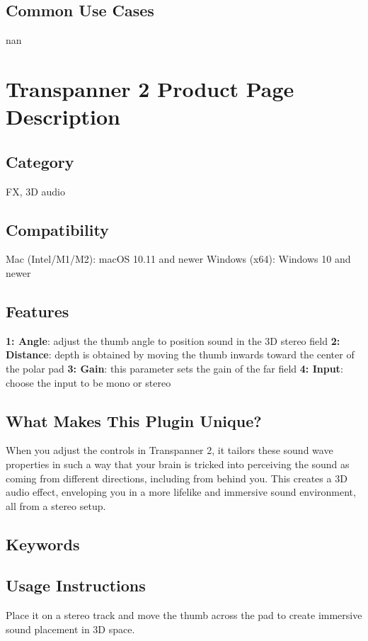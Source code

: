 \documentclass[8pt]{article}
\begin{document}
\subsection*{Common Use Cases}
nan
\section*{Transpanner 2 Product Page Description}

\subsection*{Category}
FX, 3D audio

\subsection*{Compatibility}
Mac (Intel/M1/M2): macOS 10.11 and newer
Windows (x64): Windows 10 and newer

\subsection*{Features}
\textbf{1: Angle}: adjust the thumb angle to position sound in the 3D stereo field
\textbf{2: Distance}: depth is obtained by moving the thumb inwards toward the center of the polar pad
\textbf{3: Gain}: this parameter sets the gain of the far field
\textbf{4: Input}: choose the input to be mono or stereo

\subsection*{What Makes This Plugin Unique?}
When you adjust the controls in Transpanner 2, it tailors these sound wave properties in such a way that your brain is tricked into perceiving the sound as coming from different directions, including from behind you. This creates a 3D audio effect, enveloping you in a more lifelike and immersive sound environment, all from a stereo setup.

\subsection*{Keywords}


\subsection*{Usage Instructions}
Place it on a stereo track and move the thumb across the pad to create immersive sound placement in 3D space. 
\end{document}

